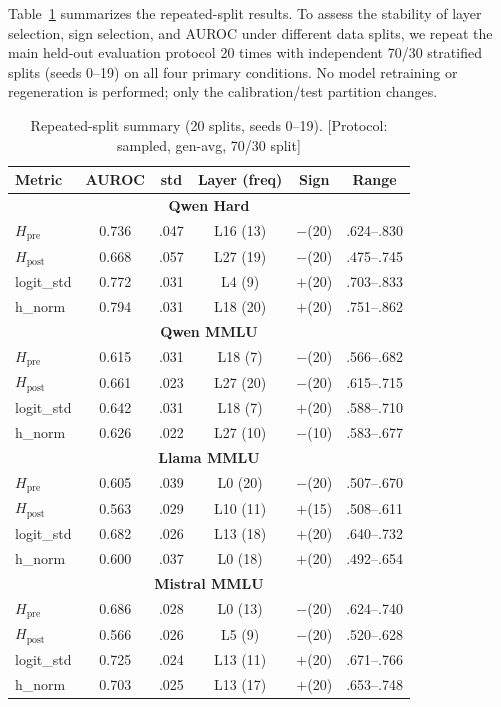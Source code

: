 \documentclass{ieeeaccess}
\newcommand{\Hpre}{H_{\text{pre}}}
\newcommand{\Hpost}{H_{\text{post}}}
\begin{document}
Table~\ref{tab:repeated} summarizes the repeated-split results. To assess the stability of layer selection, sign selection, and AUROC under different data splits, we repeat the main held-out evaluation protocol 20 times with independent 70/30 stratified splits (seeds 0--19) on all four primary conditions. No model retraining or regeneration is performed; only the calibration/test partition changes.

\begin{table}[!ht]
\centering
\caption{Repeated-split summary (20 splits, seeds 0--19). [Protocol: sampled, gen-avg, 70/30 split]}
\label{tab:repeated}
\footnotesize
\setlength{\tabcolsep}{2pt}
\begin{tabular}{l cccc c}
\toprule
Metric & AUROC & std & Layer (freq) & Sign & Range \\
\midrule
\multicolumn{6}{c}{\textbf{Qwen Hard}} \\
\midrule
$\Hpre$ & 0.736 & .047 & L16 (13) & $-$(20) & .624--.830 \\
$\Hpost$ & 0.668 & .057 & L27 (19) & $-$(20) & .475--.745 \\
logit\_std & 0.772 & .031 & L4 (9) & $+$(20) & .703--.833 \\
h\_norm & 0.794 & .031 & L18 (20) & $+$(20) & .751--.862 \\
\midrule
\multicolumn{6}{c}{\textbf{Qwen MMLU}} \\
\midrule
$\Hpre$ & 0.615 & .031 & L18 (7) & $-$(20) & .566--.682 \\
$\Hpost$ & 0.661 & .023 & L27 (20) & $-$(20) & .615--.715 \\
logit\_std & 0.642 & .031 & L18 (7) & $+$(20) & .588--.710 \\
h\_norm & 0.626 & .022 & L27 (10) & $-$(10) & .583--.677 \\
\midrule
\multicolumn{6}{c}{\textbf{Llama MMLU}} \\
\midrule
$\Hpre$ & 0.605 & .039 & L0 (20) & $-$(20) & .507--.670 \\
$\Hpost$ & 0.563 & .029 & L10 (11) & $+$(15) & .508--.611 \\
logit\_std & 0.682 & .026 & L13 (18) & $+$(20) & .640--.732 \\
h\_norm & 0.600 & .037 & L0 (18) & $+$(20) & .492--.654 \\
\midrule
\multicolumn{6}{c}{\textbf{Mistral MMLU}} \\
\midrule
$\Hpre$ & 0.686 & .028 & L0 (13) & $-$(20) & .624--.740 \\
$\Hpost$ & 0.566 & .026 & L5 (9) & $-$(20) & .520--.628 \\
logit\_std & 0.725 & .024 & L13 (11) & $+$(20) & .671--.766 \\
h\_norm & 0.703 & .025 & L13 (17) & $+$(20) & .653--.748 \\
\bottomrule
\end{tabular}
\end{table}
\end{document}
